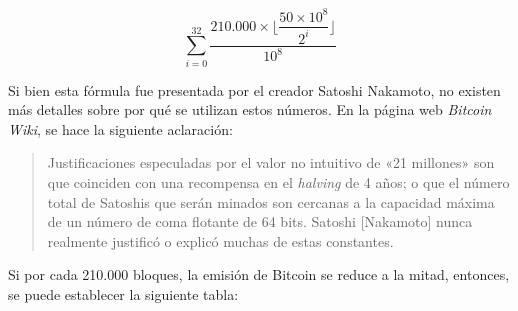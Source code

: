 \documentclass[12pt,a4paper,twoside]{book}
\begin{document}
\[
\sum_{i=0}^{32} \dfrac{210.000 \times \lfloor \dfrac{50 \times 10^{8}}{2^i} \rfloor}{10^{8}}
\]

Si bien esta fórmula fue presentada por el creador Satoshi Nakamoto, no existen más detalles sobre por qué se utilizan estos números. En la página web \textit{Bitcoin Wiki}, se hace la siguiente aclaración:

\begin{quotation}
Justificaciones especuladas por el valor no intuitivo de «21 millones» son que coinciden con una recompensa en el \textit{halving} de 4 años; o que el número total de Satoshis que serán minados son cercanas a la capacidad máxima de un número de coma flotante de 64 bits. Satoshi [Nakamoto] nunca realmente justificó o explicó muchas de estas constantes. \cite{bitwiki:oferta}
\end{quotation}

Si por cada 210.000 bloques, la emisión de Bitcoin se reduce a la mitad, entonces, se puede establecer la siguiente tabla:
\end{document}
